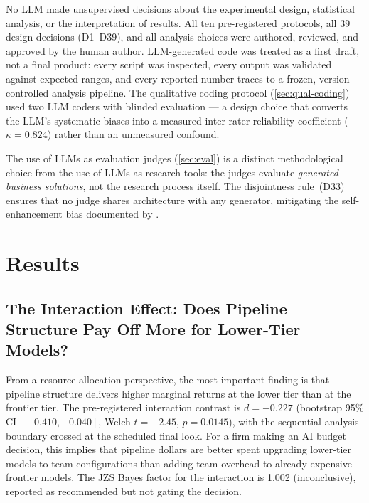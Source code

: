 \documentclass[12pt,a4paper]{article}
\begin{document}
No LLM made unsupervised decisions about the experimental design, statistical
analysis, or the interpretation of results. All ten pre-registered protocols,
all 39 design decisions (D1--D39), and all analysis choices were authored,
reviewed, and approved by the human author. LLM-generated code was treated as a
first draft, not a final product: every script was inspected, every output was
validated against expected ranges, and every reported number traces to a frozen,
version-controlled analysis pipeline. The qualitative coding protocol
(\cref{sec:qual-coding}) used two LLM coders with blinded evaluation --- a
design choice that converts the LLM's systematic biases into a measured
inter-rater reliability coefficient ($\kappa = 0.824$) rather than an unmeasured
confound.

The use of LLMs as evaluation judges (\cref{sec:eval}) is a distinct
methodological choice from the use of LLMs as research tools: the judges
evaluate \emph{generated business solutions}, not the research process itself.
The disjointness rule~(D33) ensures that no judge shares architecture with any
generator, mitigating the self-enhancement bias documented by
\citet{ZhengEtAl2023}.

\section{Results}\label{sec:results}

\subsection{The Interaction Effect: Does Pipeline Structure Pay Off More for
Lower-Tier Models?}\label{sec:interaction}

From a resource-allocation perspective, the most important finding is that
pipeline structure delivers higher marginal returns at the lower tier than at
the frontier tier. The pre-registered interaction contrast is $d = -0.227$
(bootstrap 95\% CI $[-0.410, -0.040]$, Welch $t = -2.45$, $p = 0.0145$), with
the sequential-analysis boundary crossed at the scheduled final look. For a
firm making an AI budget decision, this implies that pipeline dollars are better
spent upgrading lower-tier models to team configurations than adding team overhead to
already-expensive frontier models. The JZS Bayes factor for the interaction is
1.002 (inconclusive), reported as recommended but not gating the decision.
\end{document}
